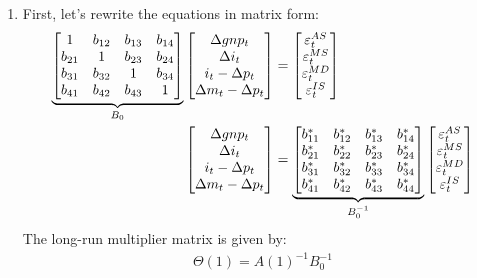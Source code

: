 \begin{enumerate}

\item First, let's rewrite the equations in matrix form:
\begin{align*}
\underbrace{%
\begin{bmatrix}
1 & b_{12} & b_{13} & b_{14}\\
b_{21} & 1 & b_{23} & b_{24}\\
b_{31} & b_{32} & 1 & b_{34}\\
b_{41} & b_{42} & b_{43} & 1
\end{bmatrix}}_{B_0}
\begin{bmatrix}
\Delta gnp_t\\
\Delta i_t\\
i_t - \Delta p_t\\
\Delta m_t - \Delta p_t
\end{bmatrix}
&=
\begin{bmatrix}
\varepsilon_t^{AS}\\
\varepsilon_t^{MS}\\
\varepsilon_t^{MD}\\
\varepsilon_t^{IS}
\end{bmatrix}
\\
\begin{bmatrix}
\Delta gnp_t\\
\Delta i_t\\
i_t - \Delta p_t\\
\Delta m_t - \Delta p_t
\end{bmatrix}
&=
\underbrace{%
\begin{bmatrix}
b^*_{11} & b^*_{12} & b^*_{13} & b^*_{14}\\
b^*_{21} & b^*_{22} & b^*_{23} & b^*_{24}\\
b^*_{31} & b^*_{32} & b^*_{33} & b^*_{34}\\
b^*_{41} & b^*_{42} & b^*_{43} & b^*_{44}
\end{bmatrix}}_{B^{-1}_0}
\begin{bmatrix}
\varepsilon_t^{AS}\\
\varepsilon_t^{MS}\\
\varepsilon_t^{MD}\\
\varepsilon_t^{IS}
\end{bmatrix}
\end{align*}
The long-run multiplier matrix is given by:
\begin{align*}
\Theta(1) = {A(1)}^{-1} B^{-1}_0
\end{align*}


\end{enumerate}
